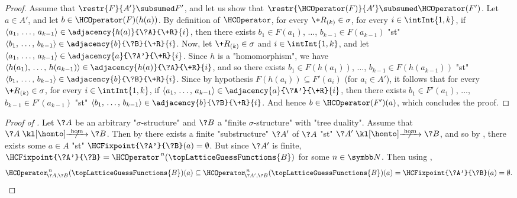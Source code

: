 \begin{proof}
	Assume that $\restr{F}{A'} \subsumed F'$, and let us show that 
	$\restr{\HCOperator(F)}{A'} \subsumed \HCOperator(F')$.
	Let $a \in A'$, and let $b \in \HCOperator(F)(h(a))$.
	By definition of $\HCOperator$, for every $\+R_{(k)} \in \sigma$,
	for every $i \in \intInt{1,k}$,
	if $\langle a_1,\, \dotsc,\, a_{k-1} \rangle \in \adjacency{h(a)}{\?A}{\+R}{i}$,
	then there exists $b_1 \in F(a_1)$, $\dotsc$, $b_{k-1} \in F(a_{k-1})$ "st" 
	$\langle b_1,\, \dotsc,\, b_{k-1} \rangle \in \adjacency{b}{\?B}{\+R}{i}$.
	Now, let $\+R_{(k)} \in \sigma$ and $i \in \intInt{1,k}$,
	and let $\langle a_1,\, \dotsc,\, a_{k-1} \rangle \in \adjacency{a}{\?A'}{\+R}{i}$.
	Since $h$ is a "homomorphism", we have $\langle h(a_1),\, \dotsc,\, h(a_{k-1}) \rangle \in \adjacency{h(a)}{\?A}{\+R}{i}$,
	and so there exists
	$b_1 \in F(h(a_1))$, $\dotsc$, $b_{k-1} \in F(h(a_{k-1}))$ "st" 
	$\langle b_1,\, \dotsc,\, b_{k-1} \rangle \in \adjacency{b}{\?B}{\+R}{i}$.
	Since by hypothesis $F(h(a_i)) \subseteq F'(a_i)$ (for $a_i \in A'$), it follows that
	for every $\+R_{(k)} \in \sigma$, for every $i \in \intInt{1,k}$,
	if $\langle a_1,\, \dotsc,\, a_{k-1} \rangle \in \adjacency{a}{\?A'}{\+R}{i}$, then
	there exists $b_1 \in F'(a_1)$, $\dotsc$, $b_{k-1} \in F'(a_{k-1})$
	"st" $\langle b_1,\, \dotsc,\, b_{k-1} \rangle \in \adjacency{b}{\?B}{\+R}{i}$.
	And hence $b \in \HCOperator(F')(a)$, which concludes the proof.
\end{proof}

\begin{proof}[Proof of ]
	Let $\?A$ be an arbitrary "$\sigma$-structure" and $\?B$ a "finite $\sigma$-structure"
	with "tree duality". Assume that $\?A \nothomto \?B$.
	Then by  there exists a finite "substructure" $\?A'$
	of $\?A$ "st" $\?A' \nothomto \?B$,
	and so by ,
	there exists some $a\in A$ "st" $\HCFixpoint{\?A'}{\?B}(a) = \emptyset$.
	But since $\?A'$ is finite, $\HCFixpoint{\?A'}{\?B} = \HCOperator^{\,n}(\topLatticeGuessFunctions{B})$ for some $n\in\N$. Then using ,
	\[
		\HCOperator_{\!\?A,\?B}^{\,n}(\topLatticeGuessFunctions{B})(a)
		\subseteq \HCOperator_{\!\?A',\?B}^{\,n}(\topLatticeGuessFunctions{B})(a)
		= \HCFixpoint{\?A'}{\?B}(a)
		= \emptyset.\qedhere
	\]
\end{proof}

